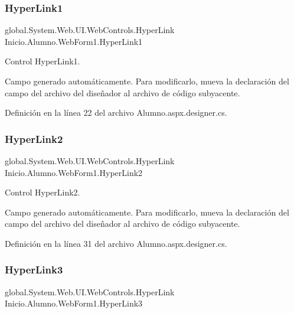 \subsubsection{\texorpdfstring{HyperLink1}{HyperLink1}}
{\footnotesize\ttfamily global.\+System.\+Web.\+U\+I.\+Web\+Controls.\+Hyper\+Link Inicio.\+Alumno.\+Web\+Form1.\+Hyper\+Link1\hspace{0.3cm}{\ttfamily [protected]}}



Control Hyper\+Link1. 

Campo generado automáticamente. Para modificarlo, mueva la declaración del campo del archivo del diseñador al archivo de código subyacente. 

Definición en la línea 22 del archivo Alumno.\+aspx.\+designer.\+cs.

\mbox{\label{classInicio_1_1Alumno_1_1WebForm1_a102ac909deb260558600a34e342f2bbc}} 
\subsubsection{\texorpdfstring{HyperLink2}{HyperLink2}}
{\footnotesize\ttfamily global.\+System.\+Web.\+U\+I.\+Web\+Controls.\+Hyper\+Link Inicio.\+Alumno.\+Web\+Form1.\+Hyper\+Link2\hspace{0.3cm}{\ttfamily [protected]}}



Control Hyper\+Link2. 

Campo generado automáticamente. Para modificarlo, mueva la declaración del campo del archivo del diseñador al archivo de código subyacente. 

Definición en la línea 31 del archivo Alumno.\+aspx.\+designer.\+cs.

\mbox{\label{classInicio_1_1Alumno_1_1WebForm1_a69cd82a51a5907999c095e1840c6ae50}} 
\subsubsection{\texorpdfstring{HyperLink3}{HyperLink3}}
{\footnotesize\ttfamily global.\+System.\+Web.\+U\+I.\+Web\+Controls.\+Hyper\+Link Inicio.\+Alumno.\+Web\+Form1.\+Hyper\+Link3\hspace{0.3cm}{\ttfamily [protected]}}



